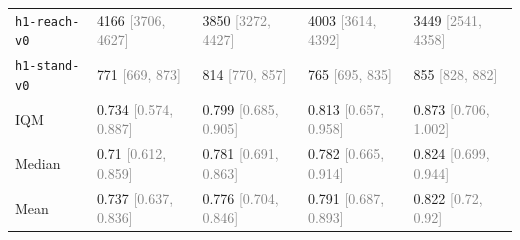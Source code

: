 \begin{tabular}{lllll}
\texttt{h1-reach-v0} & 4166 \textcolor{gray}{[3706, 4627]} & 3850 \textcolor{gray}{[3272, 4427]} & 4003 \textcolor{gray}{[3614, 4392]} & 3449 \textcolor{gray}{[2541, 4358]} \\
\texttt{h1-stand-v0} & 771 \textcolor{gray}{[669, 873]} & 814 \textcolor{gray}{[770, 857]} & 765 \textcolor{gray}{[695, 835]} & 855 \textcolor{gray}{[828, 882]} \\
IQM & 0.734 \textcolor{gray}{[0.574, 0.887]} & 0.799 \textcolor{gray}{[0.685, 0.905]} & 0.813 \textcolor{gray}{[0.657, 0.958]} & 0.873 \textcolor{gray}{[0.706, 1.002]} \\
Median & 0.71 \textcolor{gray}{[0.612, 0.859]} & 0.781 \textcolor{gray}{[0.691, 0.863]} & 0.782 \textcolor{gray}{[0.665, 0.914]} & 0.824 \textcolor{gray}{[0.699, 0.944]} \\
Mean & 0.737 \textcolor{gray}{[0.637, 0.836]} & 0.776 \textcolor{gray}{[0.704, 0.846]} & 0.791 \textcolor{gray}{[0.687, 0.893]} & 0.822 \textcolor{gray}{[0.72, 0.92]} \\
\bottomrule
\end{tabular}
